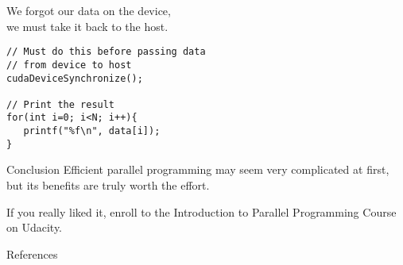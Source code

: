 \documentclass[xcolor={dvipsnames}]{beamer}
\begin{document}
\begin{frame}[fragile]{We forgot our data on the device,\\ we must take it back to the host.}
\begin{lstlisting}
// Must do this before passing data
// from device to host
cudaDeviceSynchronize();

// Print the result
for(int i=0; i<N; i++){
   printf("%f\n", data[i]);
}
\end{lstlisting}
\end{frame}

\begin{frame}{Conclusion}
Efficient parallel programming may seem very complicated at first, but its benefits are truly worth the effort.

\pause
\bigskip
If you really liked it, enroll to the Introduction to Parallel Programming Course on Udacity.
\end{frame}


\begin{frame}{References}
\nocite{*}


\end{frame}
	
\end{document}
